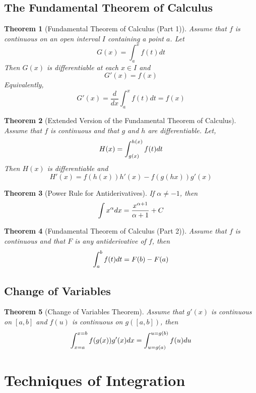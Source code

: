 \documentclass[10pt]{article}
\theoremstyle{break}
\newtheorem{thm}{Theorem}[subsection]
\begin{document}
\subsection{The Fundamental Theorem of Calculus}
\begin{thm}[Fundamental Theorem of Calculus (Part 1)]
    Assume that $f$ is continuous on an open interval $I$ containing a point $a$. Let $$G(x) =  \int^x_a f(t) dt$$Then $G(x)$ is differentiable at each $x \in I$ and $$G'(x) = f(x)$$ Equivalently, $$G'(x) = \dfrac{d}{dx}\int^x_a f(t) dt = f(x)$$
\end{thm}
\begin{thm}[Extended Version of the Fundamental Theorem of Calculus]
    Assume that $f$ is continuous and that $g$ and $h$ are differentiable. Let, $$H(x) = \int^{h(x)}_{g(x)}f(t) \space dt$$ Then $H(x)$ is differentiable and $$H'(x) = f(h(x)) h'(x) - f(g(hx))g'(x)$$
\end{thm}
\begin{thm}[Power Rule for Antiderivatives]
    If $\alpha \ne -1$, then $$\int x^\alpha \space dx = \dfrac{x^{\alpha + 1}}{\alpha + 1} + C$$
\end{thm}
\begin{thm}[Fundamental Theorem of Calculus (Part 2)]
    Assume that $f$ is continuous and that $F$ is any antiderivative of $f$, then $$\int^b_a f(t)\space dt = F(b) - F(a)$$
\end{thm}
\subsection{Change of Variables}

\begin{thm}[Change of Variables Theorem]
Assume that $g'(x)$ is continuous on $[a,b]$ and $f(u)$ is continuous on $g([a,b])$,  then $$\int^{x=b}_{x=a} f(g(x))g'(x) \space dx = \int^{u = g(b)}_{u = g(a)} f(u) \space du$$
\end{thm}




\newpage


\section{Techniques of Integration}
\end{document}
